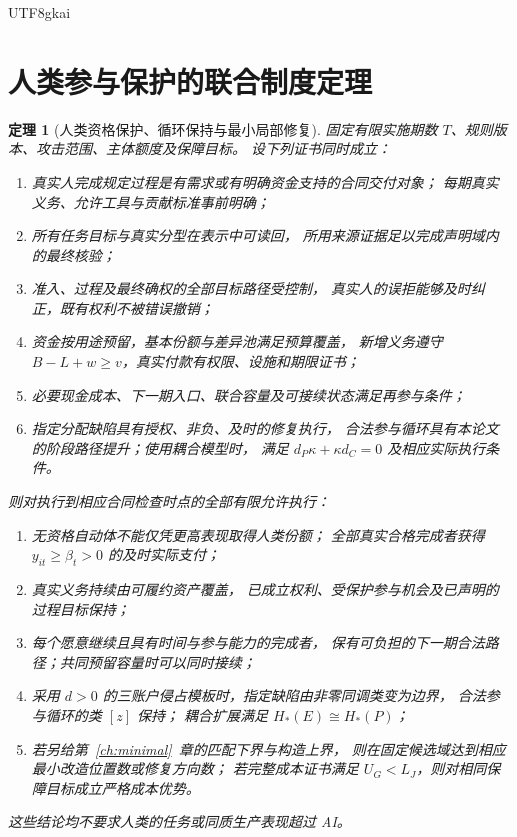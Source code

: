 \documentclass[12pt,a4paper,openany]{report}
\newtheorem{theorem}{定理}[chapter]
\begin{document}
\begin{CJK*}{UTF8}{gkai}
\section{人类参与保护的联合制度定理}
\begin{theorem}[人类资格保护、循环保持与最小局部修复]
\label{thm:main}
固定有限实施期数 \(T\)、规则版本、攻击范围、主体额度及保障目标。
设下列证书同时成立：
\begin{enumerate}[label=(H\arabic*)]
\item 真实人完成规定过程是有需求或有明确资金支持的合同交付对象；
每期真实义务、允许工具与贡献标准事前明确；
\item 所有任务目标与真实分型在表示中可读回，
所用来源证据足以完成声明域内的最终核验；
\item 准入、过程及最终确权的全部目标路径受控制，
真实人的误拒能够及时纠正，既有权利不被错误撤销；
\item 资金按用途预留，基本份额与差异池满足预算覆盖，
新增义务遵守 \(B-L+w\ge v\)，真实付款有权限、设施和期限证书；
\item 必要现金成本、下一期入口、联合容量及可接续状态满足再参与条件；
\item 指定分配缺陷具有授权、非负、及时的修复执行，
合法参与循环具有本论文的阶段路径提升；使用耦合模型时，
满足 \(d_P\kappa+\kappa d_C=0\) 及相应实际执行条件。
\end{enumerate}
则对执行到相应合同检查时点的全部有限允许执行：
\begin{enumerate}[label=(\roman*)]
\item 无资格自动体不能仅凭更高表现取得人类份额；
全部真实合格完成者获得 \(y_{it}\ge\beta_t>0\) 的及时实际支付；
\item 真实义务持续由可履约资产覆盖，
已成立权利、受保护参与机会及已声明的过程目标保持；
\item 每个愿意继续且具有时间与参与能力的完成者，
保有可负担的下一期合法路径；共同预留容量时可以同时接续；
\item 采用 \(d>0\) 的三账户侵占模板时，指定缺陷由非零同调类变为边界，
合法参与循环的类 \([z]\) 保持；
耦合扩展满足 \(H_*(E)\cong H_*(P)\)；
\item 若另给第~\ref{ch:minimal}~章的匹配下界与构造上界，
则在固定候选域达到相应最小改造位置数或修复方向数；
若完整成本证书满足 \(U_G<L_J\)，则对相同保障目标成立严格成本优势。
\end{enumerate}
这些结论均不要求人类的任务或同质生产表现超过 AI。
\end{theorem}


\end{CJK*}
\end{document}
